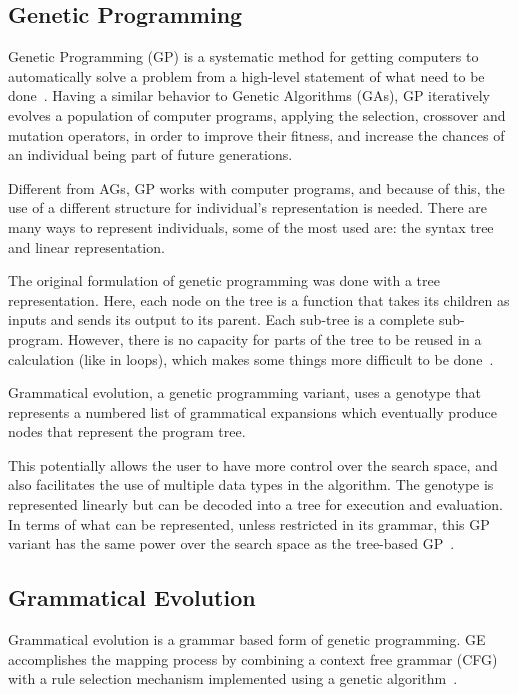 \documentclass[conference,compsoc]{IEEEtran}
\begin{document}
\subsection{Genetic Programming}

Genetic Programming (GP) is a systematic method for getting computers to automatically solve a problem from a high-level statement of what need to be done~\cite{koza2005genetic}. Having a similar behavior to Genetic Algorithms (GAs), GP iteratively evolves a population of computer programs, applying the selection, crossover and mutation operators, in order to improve their fitness, and increase the chances of an individual being part of future generations.

Different from AGs, GP works with computer programs, and because of this, the use of a different structure for individual's representation is needed. There are many ways to represent individuals, some of the most used are: the syntax tree and linear representation.

The original formulation of genetic programming was done with a tree representation. Here, each node on the tree is a function that takes its children as inputs and sends its output to its parent. Each sub-tree is a complete sub-program. However, there is no capacity for parts of the tree to be reused in a calculation (like in loops), which makes some things more difficult to be done~\cite{harris2015comparison}. 

Grammatical evolution, a genetic programming variant, uses a genotype that represents a numbered list of grammatical expansions which eventually produce nodes that represent the program tree.
 
This potentially allows the user to have more control over the search space, and also facilitates the use of multiple data types in the algorithm. The genotype is represented linearly but can be decoded into a tree for execution and evaluation. In terms of what can be represented, unless restricted in its grammar, this GP variant has the same power over the search space as the tree-based GP~\cite{harris2015comparison}.


\subsection{Grammatical Evolution} \label{subsection:grammaticalEvolution}

Grammatical evolution is a grammar based form of genetic programming. GE accomplishes the mapping process by combining a context free grammar (CFG) with a rule selection mechanism implemented using a genetic algorithm~\cite{byrne2015optimising}.
\end{document}
